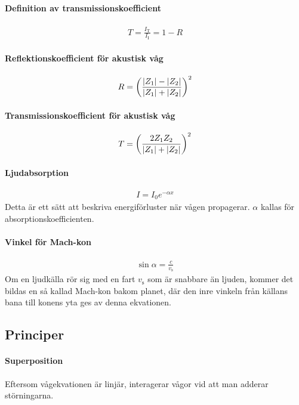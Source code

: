 \paragraph{Definition av transmissionskoefficient}
\begin{align*}
	T = \frac{I_\text{T}}{I_\text{I}} = 1 - R
\end{align*}

\paragraph{Reflektionskoefficient för akustisk våg}
\begin{align*}
	R = \left(\frac{\abs{Z_1} - \abs{Z_2}}{\abs{Z_1} + \abs{Z_2}}\right)^2
\end{align*}

\paragraph{Transmissionskoefficient för akustisk våg}
\begin{align*}
	T = \left(\frac{2Z_1Z_2}{\abs{Z_1} + \abs{Z_2}}\right)^2
\end{align*}

\paragraph{Ljudabsorption}
\begin{align*}
	I = I_0e^{-\alpha x}
\end{align*}
Detta är ett sätt att beskriva energiförluster när vågen propagerar. $\alpha$ kallas för absorptionskoefficienten.

\paragraph{Vinkel för Mach-kon}
\begin{align*}
	\sin{\alpha} = \frac{c}{v_{\text{s}}}
\end{align*}
Om en ljudkälla rör sig med en fart $v_{\text{s}}$ som är snabbare än ljuden, kommer det bildas en så kallad Mach-kon bakom planet, där den inre vinkeln från källans bana till konens yta ges av denna ekvationen.

\deriv

\subsection{Principer}

\paragraph{Superposition}
Eftersom vågekvationen är linjär, interagerar vågor vid att man adderar störningarna.


